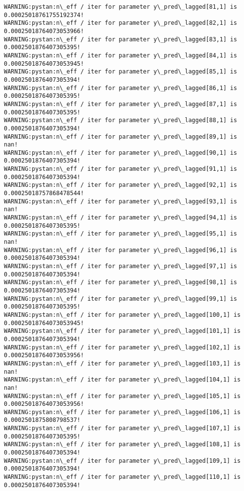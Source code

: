 \documentclass[11pt]{article}
\begin{document}
\begin{Verbatim}[commandchars=\\\{\}]
WARNING:pystan:n\_eff / iter for parameter y\_pred\_lagged[81,1] is 0.00025018761755192374!
WARNING:pystan:n\_eff / iter for parameter y\_pred\_lagged[82,1] is 0.00025018764073053966!
WARNING:pystan:n\_eff / iter for parameter y\_pred\_lagged[83,1] is 0.0002501876407305395!
WARNING:pystan:n\_eff / iter for parameter y\_pred\_lagged[84,1] is 0.00025018764073053945!
WARNING:pystan:n\_eff / iter for parameter y\_pred\_lagged[85,1] is 0.0002501876407305394!
WARNING:pystan:n\_eff / iter for parameter y\_pred\_lagged[86,1] is 0.0002501876407305395!
WARNING:pystan:n\_eff / iter for parameter y\_pred\_lagged[87,1] is 0.0002501876407305395!
WARNING:pystan:n\_eff / iter for parameter y\_pred\_lagged[88,1] is 0.0002501876407305394!
WARNING:pystan:n\_eff / iter for parameter y\_pred\_lagged[89,1] is nan!
WARNING:pystan:n\_eff / iter for parameter y\_pred\_lagged[90,1] is 0.0002501876407305394!
WARNING:pystan:n\_eff / iter for parameter y\_pred\_lagged[91,1] is 0.0002501876407305394!
WARNING:pystan:n\_eff / iter for parameter y\_pred\_lagged[92,1] is 0.00025018757868478544!
WARNING:pystan:n\_eff / iter for parameter y\_pred\_lagged[93,1] is nan!
WARNING:pystan:n\_eff / iter for parameter y\_pred\_lagged[94,1] is 0.0002501876407305395!
WARNING:pystan:n\_eff / iter for parameter y\_pred\_lagged[95,1] is nan!
WARNING:pystan:n\_eff / iter for parameter y\_pred\_lagged[96,1] is 0.0002501876407305394!
WARNING:pystan:n\_eff / iter for parameter y\_pred\_lagged[97,1] is 0.0002501876407305394!
WARNING:pystan:n\_eff / iter for parameter y\_pred\_lagged[98,1] is 0.0002501876407305394!
WARNING:pystan:n\_eff / iter for parameter y\_pred\_lagged[99,1] is 0.0002501876407305395!
WARNING:pystan:n\_eff / iter for parameter y\_pred\_lagged[100,1] is 0.00025018764073053945!
WARNING:pystan:n\_eff / iter for parameter y\_pred\_lagged[101,1] is 0.0002501876407305394!
WARNING:pystan:n\_eff / iter for parameter y\_pred\_lagged[102,1] is 0.00025018764073053956!
WARNING:pystan:n\_eff / iter for parameter y\_pred\_lagged[103,1] is nan!
WARNING:pystan:n\_eff / iter for parameter y\_pred\_lagged[104,1] is nan!
WARNING:pystan:n\_eff / iter for parameter y\_pred\_lagged[105,1] is 0.00025018764073053956!
WARNING:pystan:n\_eff / iter for parameter y\_pred\_lagged[106,1] is 0.0002501875808798537!
WARNING:pystan:n\_eff / iter for parameter y\_pred\_lagged[107,1] is 0.0002501876407305395!
WARNING:pystan:n\_eff / iter for parameter y\_pred\_lagged[108,1] is 0.0002501876407305394!
WARNING:pystan:n\_eff / iter for parameter y\_pred\_lagged[109,1] is 0.0002501876407305394!
WARNING:pystan:n\_eff / iter for parameter y\_pred\_lagged[110,1] is 0.0002501876407305394!

\end{Verbatim}
\end{document}
